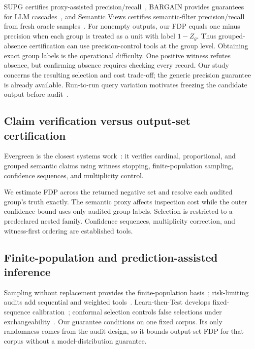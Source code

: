 \documentclass[runningheads]{llncs}
\begin{document}
SUPG certifies proxy-assisted precision/recall~\cite{supg2020}, BARGAIN provides guarantees for LLM cascades~\cite{bargain2026}, and Semantic Views certifies semantic-filter precision/recall from fresh oracle samples~\cite{semviews2026}. For nonempty outputs, our FDP equals one minus precision when each group is treated as a unit with label $1-Z_g$. Thus grouped-absence certification can use precision-control tools at the group level. Obtaining exact group labels is the operational difficulty. One positive witness refutes absence, but confirming absence requires checking every record. Our study concerns the resulting selection and cost trade-off; the generic precision guarantee is already available. Run-to-run query variation motivates freezing the candidate output before audit~\cite{variance2026}.

\subsection{Claim verification versus output-set certification}
Evergreen is the closest systems work~\cite{evergreen2026}: it verifies cardinal, proportional, and grouped semantic claims using witness stopping, finite-population sampling, confidence sequences, and multiplicity control.

We estimate FDP across the returned negative set and resolve each audited group's truth exactly. The semantic proxy affects inspection cost while the outer confidence bound uses only audited group labels. Selection is restricted to a predeclared nested family. Confidence sequences, multiplicity correction, and witness-first ordering are established tools.

\subsection{Finite-population and prediction-assisted inference}
Sampling without replacement provides the finite-population basis~\cite{cochran1977}; risk-limiting audits add sequential and weighted tools~\cite{alpha2023,rlfa2023}. Learn-then-Test develops fixed-sequence calibration~\cite{ltt2025}; conformal selection controls false selections under exchangeability~\cite{jin2023}. Our guarantee conditions on one fixed corpus. Its only randomness comes from the audit design, so it bounds output-set FDP for that corpus without a model-distribution guarantee.
\end{document}
